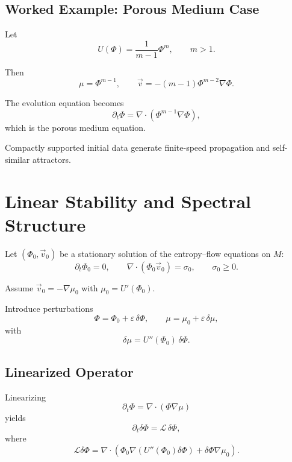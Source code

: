 \documentclass[11pt]{article}
\begin{document}
\subsection*{Worked Example: Porous Medium Case}

Let
\begin{equation}
U(\Phi) = \frac{1}{m-1} \Phi^m, \qquad m>1.
\end{equation}

Then
\begin{equation}
\mu = \Phi^{m-1},
\qquad
\vec{v} = - (m-1)\Phi^{m-2}\nabla \Phi.
\end{equation}

The evolution equation becomes
\begin{equation}
\partial_t \Phi
=
\nabla \cdot \left( \Phi^{m-1} \nabla \Phi \right),
\end{equation}
which is the porous medium equation.

Compactly supported initial data generate finite-speed propagation and self-similar attractors.
\section{Linear Stability and Spectral Structure}

Let $(\Phi_0,\vec{v}_0)$ be a stationary solution of the entropy--flow equations on $M$:
\begin{equation}
\partial_t \Phi_0 = 0,
\qquad
\nabla \cdot (\Phi_0 \vec{v}_0) = \sigma_0,
\qquad
\sigma_0 \ge 0.
\end{equation}

Assume $\vec{v}_0 = -\nabla \mu_0$ with $\mu_0 = U'(\Phi_0)$.

Introduce perturbations
\begin{equation}
\Phi = \Phi_0 + \varepsilon \,\delta\Phi,
\qquad
\mu = \mu_0 + \varepsilon \,\delta\mu,
\end{equation}
with
\begin{equation}
\delta\mu = U''(\Phi_0)\,\delta\Phi.
\end{equation}

\subsection*{Linearized Operator}

Linearizing
\[
\partial_t \Phi = \nabla\cdot(\Phi\nabla\mu)
\]
yields
\begin{equation}
\partial_t \delta\Phi
=
\mathcal{L}\,\delta\Phi,
\end{equation}
where
\begin{equation}
\mathcal{L}\delta\Phi
=
\nabla\cdot\!\left(
\Phi_0 \nabla (U''(\Phi_0)\delta\Phi)
+
\delta\Phi \nabla\mu_0
\right).
\end{equation}
\end{document}
